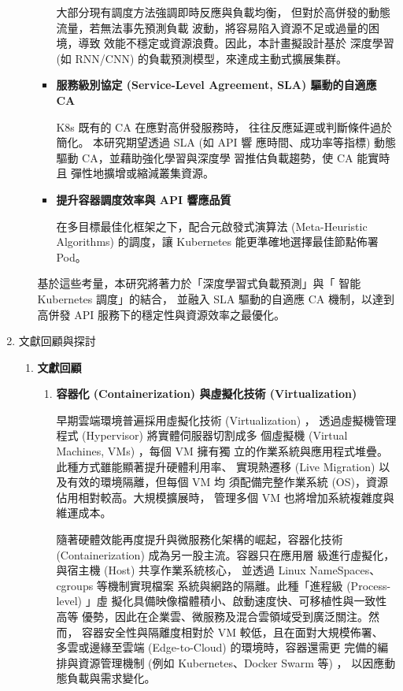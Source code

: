\documentclass[12pt,a4paper]{article}
\begin{document}
\begin{enumerate}[label={(\zhdig*)}, leftmargin=2\parindent, listparindent=\parindent]
\begin{enumerate}[label={(\arabic*)}, leftmargin=\parindent, listparindent=\parindent]
\begin{itemize}[leftmargin=\parindent, listparindent=\parindent]
大部分現有調度方法強調即時反應與負載均衡，
但對於高併發的動態流量，若無法事先預測負載
波動，將容易陷入資源不足或過量的困境，導致
效能不穩定或資源浪費。因此，本計畫擬設計基於
深度學習 (如 RNN/CNN) 的負載預測模型，來達成主動式擴展集群。

    \item\textbf{服務級別協定 (Service-Level Agreement, SLA) 驅動的自適應 CA}

K8s 既有的 CA 在應對高併發服務時，
往往反應延遲或判斷條件過於簡化。
本研究期望透過 SLA (如 API 響
應時間、成功率等指標) 動態驅動
CA，並藉助強化學習與深度學
習推估負載趨勢，使 CA 能實時且
彈性地擴增或縮減叢集資源。

    \item\textbf{提升容器調度效率與 API 響應品質}

在多目標最佳化框架之下，配合元啟發式演算法 (Meta-Heuristic Algorithms)
的調度，讓 Kubernetes 能更準確地選擇最佳節點佈署 Pod。

\end{itemize}

基於這些考量，本研究將著力於「深度學習式負載預測」與「 智能 Kubernetes 調度」的結合，
並融入 SLA 驅動的自適應 CA 機制，以達到高併發 API 服務下的穩定性與資源效率之最優化。

\end{enumerate}
\item 文獻回顧與探討

\begin{enumerate}[label={(\arabic*)}, leftmargin=\parindent, listparindent=\parindent]
\item \textbf{文獻回顧}
\begin{enumerate}[label={(\zhdig*)}, leftmargin=\parindent, listparindent=\parindent]

\item\textbf{容器化 (Containerization) \cite{9}與虛擬化技術
    (Virtualization) \cite{8}}

早期雲端環境普遍採用虛擬化技術 (Virtualization) ，
透過虛擬機管理程式 (Hypervisor) 將實體伺服器切割成多
個虛擬機 (Virtual Machines, VMs) ，每個 VM 擁有獨
立的作業系統與應用程式堆疊。此種方式雖能顯著提升硬體利用率、
實現熱遷移 (Live Migration) 以及有效的環境隔離，但每個 VM 均
須配備完整作業系統 (OS)，資源佔用相對較高。大規模擴展時，
管理多個 VM 也將增加系統複雜度與維運成本。

隨著硬體效能再度提升與微服務化架構的崛起，容器化技術
(Containerization) 成為另一股主流。容器只在應用層
級進行虛擬化，與宿主機 (Host) 共享作業系統核心，
並透過 Linux NameSpaces、cgroups 等機制實現檔案
系統與網路的隔離。此種「進程級 (Process-level) 」虛
擬化具備映像檔體積小、啟動速度快、可移植性與一致性高等
優勢，因此在企業雲、微服務及混合雲領域受到廣泛關注。然而，
容器安全性與隔離度相對於 VM 較低，且在面對大規模佈署、
多雲或邊緣至雲端 (Edge-to-Cloud) 的環境時，容器還需更
完備的編排與資源管理機制 (例如 Kubernetes、Docker Swarm 等) ，
以因應動態負載與需求變化。


\end{enumerate}
\end{enumerate}
\end{enumerate}
\end{document}
